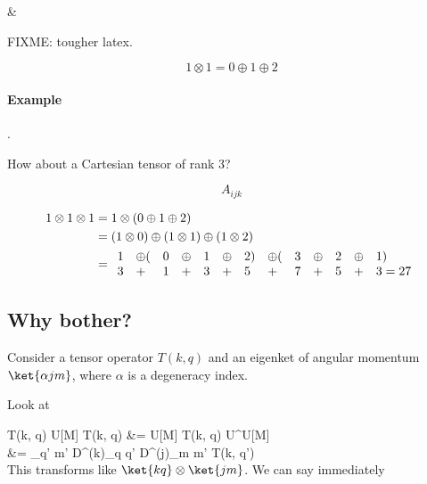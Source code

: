  &\leftrightarrow {}

FIXME: tougher latex.
%

\begin{equation}\label{eqn:qmTwoL20:n}
1 \otimes 1 = 0 \oplus 1 \oplus 2
\end{equation}

\paragraph{Example}.

How about a Cartesian tensor of rank 3?

\begin{equation}\label{eqn:qmTwoL20:n}
A_{ijk}
\end{equation}

\begin{align*}\label{eqn:qmTwoL20:n}
1 \otimes 1 \otimes 1  
&=
1 \otimes ( 0 \oplus 1 \oplus 2) \\
&=
(1 \otimes 0) \oplus (1 \otimes 1) \oplus (1 \otimes 2) \\
&=
\begin{array}{l l l l l l l l l l l l l l}
1 &\oplus ( &0 &\oplus &1 &\oplus &2) &\oplus (&3  &\oplus & 2 &\oplus &1) \\
3 &+        &1 &+      &3 &+      &5  &+       &7  &+      & 5 &+      &3 = 27
\end{array}
\end{align*}

\subsection{Why bother?}

Consider a tensor operator $T(k, q)$ and an eigenket of angular momentum $\ket{\alpha j m}$, where $\alpha$ is a degeneracy index.

Look at

T(k, q) 
U[M] T(k, q) 
&=
U[M] T(k, q) U^\dagger[M] U[M]  \\
&=
\sum_{q' m'} 
D^{(k)}_{q q'} 
D^{(j)}_{m m'} 
T(k, q')  
\\

This transforms like $\ket{k q} \otimes \ket{j m}$.  We can say immediately

